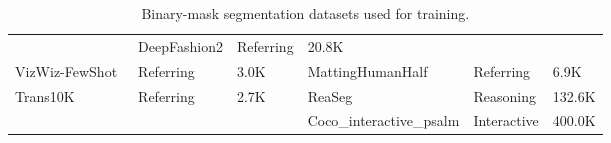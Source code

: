 \begin{table}[htbp]
\begin{tabular}{p{}|p{}|p{}||p{}|p{}|p{}}
    & DeepFashion2 \cite{DeepFashion2} & Referring & 20.8K \\
    VizWiz-FewShot~\cite{tseng2022vizwizfewshotlocatingobjectsimages} & Referring & 3.0K
    & MattingHumanHalf \cite{aisegment2019matting}& Referring & 6.9K \\
    Trans10K~\cite{xie2020segmentingtransparentobjectswild} & Referring & 2.7K
    & ReaSeg \cite{lisa,yang2023improved}& Reasoning & 132.6K \\
    & & & Coco\_interactive\_psalm \cite{zhang2025psalm} & Interactive & 400.0K \\
    \bottomrule
  \end{tabular}
  \caption{Binary-mask segmentation datasets used for training.}
  \label{tab:seg-datasets-bin}
\end{table}

